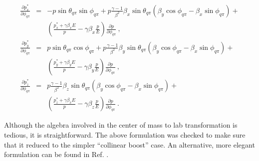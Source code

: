 \begin{eqnarray}
\frac{\partial{p_x^*}}{\partial{\phi_{q\pi}}} & = & 
-p\sin{\theta_{q\pi}}\sin{\phi_{q\pi}} + 
p \frac{\gamma-1}{\beta^2} \beta_x \sin{\theta_{q\pi}} 
(\beta_y\cos{\phi_{q\pi}} - \beta_x\sin{\phi_{q\pi}}) +  \nonumber \\
& & \left(\frac{p_x^*+\gamma\beta_xE}{p} - \gamma\beta_x\frac{p}{E} \right)
\frac{\partial{p}}{\partial{\phi_{q\pi}}}                 \:,       \\
\frac{\partial{p_y^*}}{\partial{\phi_{q\pi}}} & = & 
p\sin{\theta_{q\pi}}\cos{\phi_{q\pi}} + 
p \frac{\gamma-1}{\beta^2} \beta_y \sin{\theta_{q\pi}} 
(\beta_y\cos{\phi_{q\pi}} - \beta_x\sin{\phi_{q\pi}}) + \nonumber \\ 
& & \left(\frac{p_y^*+\gamma\beta_yE}{p} - \gamma\beta_y\frac{p}{E} \right)
\frac{\partial{p}}{\partial{\phi_{q\pi}}}                \:,         \\
\frac{\partial{p_z^*}}{\partial{\phi_{q\pi}}} & = &
p \frac{\gamma-1}{\beta^2} \beta_z \sin{\theta_{q\pi}} 
(\beta_y\cos{\phi_{q\pi}} - \beta_x\sin{\phi_{q\pi}}) + \nonumber \\
& & \left(\frac{p_z^*+\gamma\beta_xE}{p} - \gamma\beta_z\frac{p}{E} \right)
\frac{\partial{p}}{\partial{\phi_{q\pi}}}     \:.
\end{eqnarray}

Although the algebra involved in the center of mass to lab transformation is 
tedious, it is straightforward.  The above formulation was checked to make sure
that it reduced to the simpler ``collinear boost'' case.  An alternative, more
elegant formulation can be found in Ref. \cite{quasifree_kaon}.

